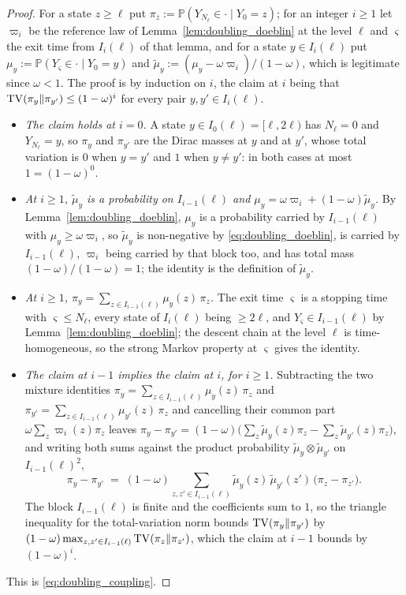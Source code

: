 \begin{proof}
For a state $z\geq\ell$ put $\pi_z:=\mathbb P(Y_{N_\ell}\in\cdot\mid Y_0=z)$; for an integer
$i\geq1$ let $\varpi_i$ be the reference law of Lemma~\ref{lem:doubling_doeblin} at the level
$\ell$ and $\varsigma$ the exit time from $I_i(\ell)$ of that lemma, and for a state
$y\in I_i(\ell)$ put $\mu_y:=\mathbb P(Y_\varsigma\in\cdot\mid Y_0=y)$ and
$\widetilde\mu_y:=(\mu_y-\omega\varpi_i)/(1-\omega)$, which is legitimate since $\omega<1$. The
proof is by induction on $i$, the claim at $i$ being that
$\mathrm{TV}(\pi_y\|\pi_{y'})\leq(1-\omega)^{i}$ for every pair $y,y'\in I_i(\ell)$.
\begin{itemize}
    \item \emph{The claim holds at $i=0$.} A state $y\in I_0(\ell)=[\ell,2\ell)$ has
    $N_\ell=0$ and $Y_{N_\ell}=y$, so $\pi_y$ and $\pi_{y'}$ are the Dirac masses at $y$ and
    at $y'$, whose total variation is $0$ when $y=y'$ and $1$ when $y\neq y'$: in both cases
    at most $1=(1-\omega)^{0}$.
    \item \emph{At $i\geq1$, $\widetilde\mu_y$ is a probability on $I_{i-1}(\ell)$ and
    $\mu_y=\omega\varpi_i+(1-\omega)\widetilde\mu_y$.} By
    Lemma~\ref{lem:doubling_doeblin}, $\mu_y$ is a probability carried by $I_{i-1}(\ell)$ with
    $\mu_y\geq\omega\varpi_i$, so $\widetilde\mu_y$ is non-negative by
    \eqref{eq:doubling_doeblin}, is carried by $I_{i-1}(\ell)$, $\varpi_i$ being carried by
    that block too, and has total mass $(1-\omega)/(1-\omega)=1$; the identity is the
    definition of $\widetilde\mu_y$.
    \item \emph{At $i\geq1$, $\pi_y=\sum_{z\in I_{i-1}(\ell)}\mu_y(z)\,\pi_z$.} The exit time
    $\varsigma$ is a stopping time with $\varsigma\leq N_\ell$, every state of $I_i(\ell)$
    being $\geq2\ell$, and $Y_\varsigma\in I_{i-1}(\ell)$ by
    Lemma~\ref{lem:doubling_doeblin}; the descent chain at the level $\ell$ is
    time-homogeneous, so the strong Markov property at $\varsigma$ gives the identity.
    \item \emph{The claim at $i-1$ implies the claim at $i$, for $i\geq1$.} Subtracting the
    two mixture identities $\pi_y=\sum_{z\in I_{i-1}(\ell)}\mu_y(z)\,\pi_z$ and
    $\pi_{y'}=\sum_{z\in I_{i-1}(\ell)}\mu_{y'}(z)\,\pi_z$ and cancelling their common part
    $\omega\sum_z\varpi_i(z)\pi_z$ leaves
    $\pi_y-\pi_{y'}=(1-\omega)\bigl(\sum_z\widetilde\mu_y(z)\pi_z
    -\sum_z\widetilde\mu_{y'}(z)\pi_z\bigr)$, and writing both sums against the product
    probability $\widetilde\mu_y\otimes\widetilde\mu_{y'}$ on $I_{i-1}(\ell)^2$,
    \begin{equation}
        \pi_y-\pi_{y'}\;=\;(1-\omega)\!\!\sum_{z,z'\in I_{i-1}(\ell)}\!\!
        \widetilde\mu_y(z)\,\widetilde\mu_{y'}(z')\,\bigl(\pi_z-\pi_{z'}\bigr) .
    \end{equation}
    The block $I_{i-1}(\ell)$ is finite and the coefficients sum to $1$, so the triangle
    inequality for the total-variation norm bounds $\mathrm{TV}(\pi_y\|\pi_{y'})$ by
    $(1-\omega)\max_{z,z'\in I_{i-1}(\ell)}\mathrm{TV}(\pi_z\|\pi_{z'})$, which the claim at $i-1$
    bounds by $(1-\omega)^{i}$.
\end{itemize}
This is \eqref{eq:doubling_coupling}.
\end{proof}

